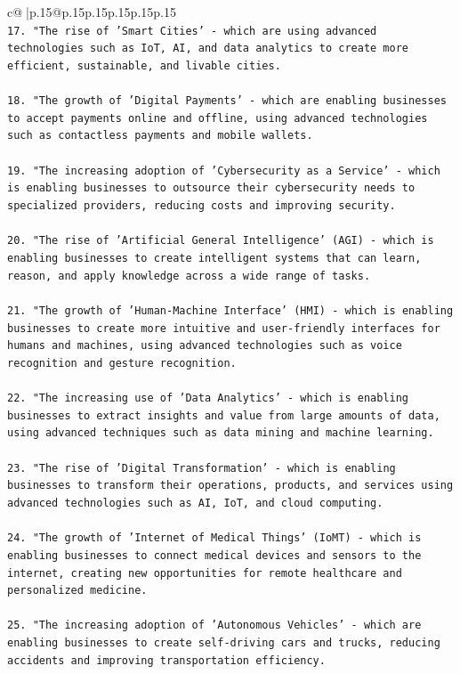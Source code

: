 \documentclass{article}
\begin{document}
{\begin{supertabular}{c@{$\;$}|p{.15\linewidth}@{}p{.15\linewidth}p{.15\linewidth}p{.15\linewidth}p{.15\linewidth}p{.15\linewidth}}
{{{\\ 
\texttt{17. "The rise of 'Smart Cities' {-} which are using advanced technologies such as IoT, AI, and data analytics to create more efficient, sustainable, and livable cities.} \\
\\ 
\texttt{18. "The growth of 'Digital Payments' {-} which are enabling businesses to accept payments online and offline, using advanced technologies such as contactless payments and mobile wallets.} \\
\\ 
\texttt{19. "The increasing adoption of 'Cybersecurity as a Service' {-} which is enabling businesses to outsource their cybersecurity needs to specialized providers, reducing costs and improving security.} \\
\\ 
\texttt{20. "The rise of 'Artificial General Intelligence' (AGI) {-} which is enabling businesses to create intelligent systems that can learn, reason, and apply knowledge across a wide range of tasks.} \\
\\ 
\texttt{21. "The growth of 'Human{-}Machine Interface' (HMI) {-} which is enabling businesses to create more intuitive and user{-}friendly interfaces for humans and machines, using advanced technologies such as voice recognition and gesture recognition.} \\
\\ 
\texttt{22. "The increasing use of 'Data Analytics' {-} which is enabling businesses to extract insights and value from large amounts of data, using advanced techniques such as data mining and machine learning.} \\
\\ 
\texttt{23. "The rise of 'Digital Transformation' {-} which is enabling businesses to transform their operations, products, and services using advanced technologies such as AI, IoT, and cloud computing.} \\
\\ 
\texttt{24. "The growth of 'Internet of Medical Things' (IoMT) {-} which is enabling businesses to connect medical devices and sensors to the internet, creating new opportunities for remote healthcare and personalized medicine.} \\
\\ 
\texttt{25. "The increasing adoption of 'Autonomous Vehicles' {-} which are enabling businesses to create self{-}driving cars and trucks, reducing accidents and improving transportation efficiency.} \\
}}}
\end{supertabular}}
\end{document}
